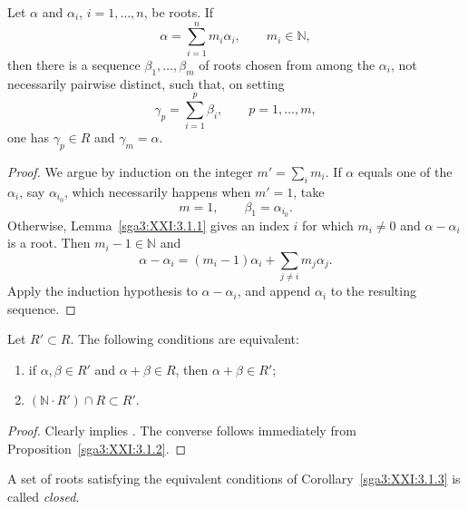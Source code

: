 \begin{proposition}\label{sga3:XXI:3.1.2}
Let \(\alpha\) and \(\alpha_i\), \(i=1,\ldots,n\), be roots. If
\[
 \alpha=\sum_{i=1}^n m_i\alpha_i,
 \qquad m_i\in\mathbb N,
\]
then there is a sequence \(\beta_1,\ldots,\beta_m\) of roots chosen
from among the \(\alpha_i\), not necessarily pairwise distinct, such
that, on setting
\[
 \gamma_p=\sum_{i=1}^p\beta_i,\qquad p=1,\ldots,m,
\]
one has \(\gamma_p\in R\) and \(\gamma_m=\alpha\).
\end{proposition}

\begin{proof}
We argue by induction on the integer
\(m'=\sum_i m_i\). If \(\alpha\) equals one of the \(\alpha_i\), say
\(\alpha_{i_0}\), which necessarily happens when \(m'=1\), take
\[
 m=1,\qquad\beta_1=\alpha_{i_0}.
\]
Otherwise, Lemma~\ref{sga3:XXI:3.1.1} gives an index \(i\) for which
\(m_i\neq0\) and \(\alpha-\alpha_i\) is a root. Then
\(m_i-1\in\mathbb N\) and
\[
 \alpha-\alpha_i
 =(m_i-1)\alpha_i+\sum_{j\neq i}m_j\alpha_j.
\]
Apply the induction hypothesis to \(\alpha-\alpha_i\), and append
\(\alpha_i\) to the resulting sequence.
\end{proof}

\begin{corollary}\label{sga3:XXI:3.1.3}
Let \(R'\subset R\). The following conditions are equivalent:
\begin{enumerate}
\item[\SGAInlineRefTarget{sga3:XXI:3.1.3:item:i}(i)] if \(\alpha,\beta\in R'\) and \(\alpha+\beta\in R\), then
  \(\alpha+\beta\in R'\);
\item[\SGAInlineRefTarget{sga3:XXI:3.1.3:item:ii}(ii)] \((\mathbb N\cdot R')\cap R\subset R'\).
\end{enumerate}
\end{corollary}

\begin{proof}
Clearly  implies . The converse follows immediately from
Proposition~\ref{sga3:XXI:3.1.2}.
\end{proof}

\begin{definition}\label{sga3:XXI:3.1.4}
A set of roots satisfying the equivalent conditions of
Corollary~\ref{sga3:XXI:3.1.3} is called \emph{closed}.
\end{definition}

